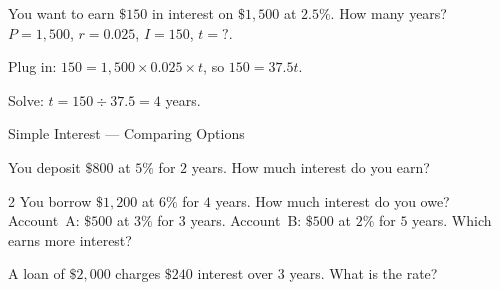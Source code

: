 \begin{stepExample}{You want to earn $\$150$ in interest on $\$1{,}500$ at $2.5\%$. How many years?}
     $P = 1{,}500$, $r = 0.025$, $I = 150$, $t = ?$.

     Plug in: $150 = 1{,}500 \times 0.025 \times t$, so $150 = 37.5t$.

     Solve: $t = 150 \div 37.5 = 4$ years.
\end{stepExample}


\newpage
\begin{stepPractice}{Simple Interest — Comparing Options}
    \resetProblems

    \prob You deposit $\$800$ at $5\%$ for $2$ years. How much interest do you earn? \answerBlank[2cm]

    \begin{multicols}{2}
    \prob You borrow $\$1{,}200$ at $6\%$ for $4$ years. How much interest do you owe? \answerBlank[2cm]
    \prob Account~A: $\$500$ at $3\%$ for $3$ years. Account~B: $\$500$ at $2\%$ for $5$ years. Which earns more interest? \answerBlank[2cm]
    \end{multicols}

    \prob A loan of $\$2{,}000$ charges $\$240$ interest over $3$ years. What is the rate? \answerBlank[2cm]

\end{stepPractice}
